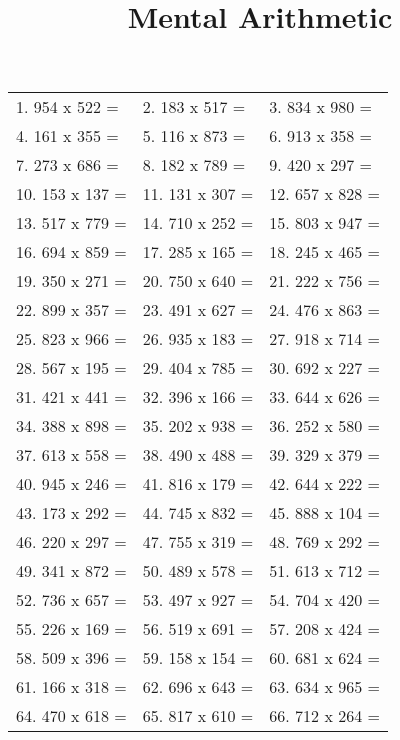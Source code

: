 \documentclass[a4paper]{article}
\title{Mental Arithmetic}
\date{\date}
\begin{document}
\begin{tabularx}{\textwidth}{ |X|X|X| }
1. 954 x 522 = &  2. 183 x 517 = &  3. 834 x 980 =  \\
4. 161 x 355 = &  5. 116 x 873 = &  6. 913 x 358 =  \\
7. 273 x 686 = &  8. 182 x 789 = &  9. 420 x 297 =  \\
10. 153 x 137 = &  11. 131 x 307 = &  12. 657 x 828 =  \\
13. 517 x 779 = &  14. 710 x 252 = &  15. 803 x 947 =  \\
16. 694 x 859 = &  17. 285 x 165 = &  18. 245 x 465 =  \\
19. 350 x 271 = &  20. 750 x 640 = &  21. 222 x 756 =  \\
22. 899 x 357 = &  23. 491 x 627 = &  24. 476 x 863 =  \\
25. 823 x 966 = &  26. 935 x 183 = &  27. 918 x 714 =  \\
28. 567 x 195 = &  29. 404 x 785 = &  30. 692 x 227 =  \\
31. 421 x 441 = &  32. 396 x 166 = &  33. 644 x 626 =  \\
34. 388 x 898 = &  35. 202 x 938 = &  36. 252 x 580 =  \\
37. 613 x 558 = &  38. 490 x 488 = &  39. 329 x 379 =  \\
40. 945 x 246 = &  41. 816 x 179 = &  42. 644 x 222 =  \\
43. 173 x 292 = &  44. 745 x 832 = &  45. 888 x 104 =  \\
46. 220 x 297 = &  47. 755 x 319 = &  48. 769 x 292 =  \\
49. 341 x 872 = &  50. 489 x 578 = &  51. 613 x 712 =  \\
52. 736 x 657 = &  53. 497 x 927 = &  54. 704 x 420 =  \\
55. 226 x 169 = &  56. 519 x 691 = &  57. 208 x 424 =  \\
58. 509 x 396 = &  59. 158 x 154 = &  60. 681 x 624 =  \\
61. 166 x 318 = &  62. 696 x 643 = &  63. 634 x 965 =  \\
64. 470 x 618 = &  65. 817 x 610 = &  66. 712 x 264 =  \\
\end{tabularx}
\end{document}
